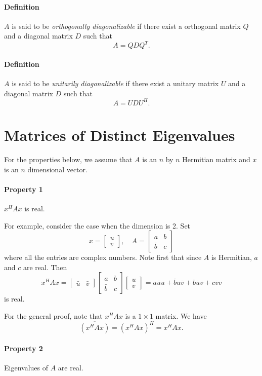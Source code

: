 \documentclass{article}
\begin{document}
\paragraph{Definition}
$A$ is said to be \emph{orthogonally diagonalizable} if there exist a orthogonal matrix $Q$ and a diagonal matrix $D$ such that
\[A=QDQ^T.\]

\paragraph{Definition}
$A$ is said to be \emph{unitarily diagonalizable} if there exist a unitary matrix $U$ and a diagonal matrix $D$ such that
\[A=UDU^H.\]

%
\section{Matrices of Distinct Eigenvalues}
For the properties below, we assume that $A$ is an $n$ by $n$ Hermitian matrix and $x$ is an $n$ dimensional vector.

\paragraph{Property 1}
\(x^HAx\) is real.

\medskip
For example, consider the case when the dimension is 2.
Set
\[x=\begin{bmatrix}u\\v\end{bmatrix},\quad
A=\begin{bmatrix}
a&b\\\bar b&c
\end{bmatrix}
\]
where all the entries are complex numbers.
Note first that since $A$ is Hermitian, $a$ and $c$ are real.
Then
\[x^HAx=
\begin{bmatrix}
\bar u&\bar v
\end{bmatrix}
\begin{bmatrix}
a&b\\\bar b&c
\end{bmatrix}
\begin{bmatrix}
u\\v
\end{bmatrix}
=a\bar uu+\bar bu\bar v+b\bar uv+c\bar vv
\]
is real.

For the general proof, note that $x^HAx$ is a $1\times1$ matrix.
We have
$$\overline{(x^HAx)}=(x^HAx)^H=x^HAx.$$

\paragraph{Property 2}
Eigenvalues of $A$ are real.
\end{document}
